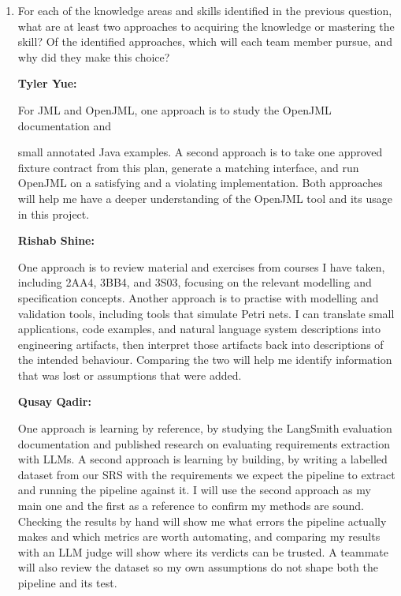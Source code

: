 \documentclass[12pt, titlepage]{article}
\begin{document}
\begin{enumerate}
  \textbf{Saumy Patel:}

  I will need to develop my understanding of the Model Context Protocol (MCP) and
  how to test an MCP server. \progname{} relies on MCP to connect coding assistants
  to its workflow, so I need to understand how clients initialize a connection,
  discover tools, and call them. I also need to learn how to test this boundary from
  a security perspective. OP-3 requires conformance with the MCP specification, and
  SEC-1 requires showing that an assistant cannot approve, edit, or reject a proposal
  through any tool it can reach.

  \item For each of the knowledge areas and skills identified in the previous
  question, what are at least two approaches to acquiring the knowledge or
  mastering the skill?  Of the identified approaches, which will each team
  member pursue, and why did they make this choice?
  
  \textbf{Tyler Yue:}

  For JML and OpenJML, one approach is to study the OpenJML documentation and
  
  small annotated Java examples. A second approach is to take one approved
  fixture contract from this plan, generate a matching interface, and run
  OpenJML on a satisfying and a violating implementation. Both approaches 
  will help me have a deeper understanding of the OpenJML tool and its usage in this project.

  \textbf{Rishab Shine:}

  One approach is to review material and exercises from courses I have taken,
  including 2AA4, 3BB4, and 3S03, focusing on the relevant modelling and
  specification concepts. Another approach is to practise with modelling and
  validation tools, including tools that simulate Petri nets. I can translate
  small applications, code examples, and natural language system descriptions
  into engineering artifacts, then interpret those artifacts back into
  descriptions of the intended behaviour. Comparing the two will help me
  identify information that was lost or assumptions that were added.

  \textbf{Qusay Qadir:} 

  One approach is learning by reference, by studying the LangSmith evaluation
  documentation and published research on evaluating requirements extraction
  with LLMs. A second approach is learning by building, by writing a labelled
  dataset from our SRS with the requirements we expect the pipeline to extract
  and running the pipeline against it. I will use the second approach as my
  main one and the first as a reference to confirm my methods are sound.
  Checking the results by hand will show me what errors the pipeline actually
  makes and which metrics are worth automating, and comparing my results with
  an LLM judge will show where its verdicts can be trusted. A teammate will
  also review the dataset so my own assumptions do not shape both the pipeline
  and its test.


\end{enumerate}
\end{document}
